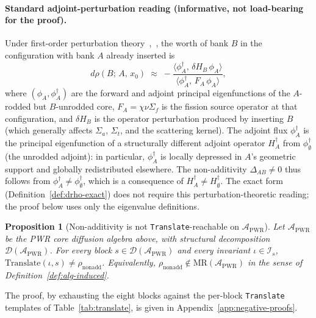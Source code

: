 \documentclass[manuscript]{acmart}
\newtheorem{proposition}{Proposition}
\begin{document}
\paragraph{Standard adjoint-perturbation reading (informative, not load-bearing for the proof).}
Under first-order perturbation theory~\cite[\S6.3]{BellGlasstone1970},~\cite[\S4.4]{LewisMiller1993}, the worth of bank $B$ in the configuration with bank $A$ already inserted is
\[
d\rho(B;\,A,\,x_{0}) \;\approx\; -\frac{\langle \phi^{\dagger}_{A},\, \delta H_{B}\, \phi_{A}\rangle}{\langle \phi^{\dagger}_{A},\, F_{A}\, \phi_{A}\rangle},
\]
where $(\phi_{A}, \phi^{\dagger}_{A})$ are the forward and adjoint principal eigenfunctions of the $A$-rodded but $B$-unrodded core, $F_{A} = \chi \nu \Sigma_{f}$ is the fission source operator at that configuration, and $\delta H_{B}$ is the operator perturbation produced by inserting $B$ (which generally affects $\Sigma_{a}$, $\Sigma_{t}$, and the scattering kernel). The adjoint flux $\phi^{\dagger}_{A}$ is the principal eigenfunction of a structurally different adjoint operator $H^{\dagger}_{A}$ from $\phi^{\dagger}_{\emptyset}$ (the unrodded adjoint): in particular, $\phi^{\dagger}_{A}$ is locally depressed in $A$'s geometric support and globally redistributed elsewhere. The non-additivity $\Delta_{AB} \neq 0$ thus follows from $\phi^{\dagger}_{A} \neq \phi^{\dagger}_{\emptyset}$, which is a consequence of $H^{\dagger}_{A} \neq H^{\dagger}_{\emptyset}$. The exact form (Definition~\ref{def:drho-exact}) does not require this perturbation-theoretic reading; the proof below uses only the eigenvalue definitions.

\begin{proposition}[Non-additivity is not \texttt{Translate}-reachable on $\mathcal{A}_{\mathrm{PWR}}$]
\label{prop:nonadd}
Let $\mathcal{A}_{\mathrm{PWR}}$ be the PWR core diffusion algebra above, with structural decomposition $\mathcal{D}(\mathcal{A}_{\mathrm{PWR}})$. For every block $s \in \mathcal{D}(\mathcal{A}_{\mathrm{PWR}})$ and every invariant $\iota \in \mathcal{I}_{s}$, $\mathrm{Translate}(\iota, s) \neq \rho_{\mathrm{nonadd}}$. Equivalently, $\rho_{\mathrm{nonadd}} \notin \mathrm{MR}(\mathcal{A}_{\mathrm{PWR}})$ in the sense of Definition~\ref{def:alg-induced}.
\end{proposition}

The proof, by exhausting the eight blocks against the per-block \texttt{Translate} templates of Table~\ref{tab:translate}, is given in Appendix~\ref{app:negative-proofs}.
\end{document}
